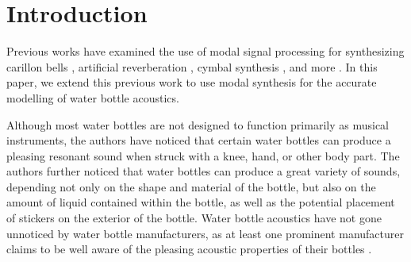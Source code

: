\documentclass[twoside,a4paper]{article}
\title{\papertitle}
\affiliation{
\paperauthorA \, }
{\href{http://ccrma.stanford.edu}{Center for Computer Research in Music and Acoustics} \\ Stanford University \\ Palo Alto, CA \\ {\tt\{jatin|kermit|mrau\}@ccrma.stanford.edu}}
\newif\ifpdf
\begin{document}
\ifpdf %
  \DeclareGraphicsExtensions{.png,.jpg,.pdf}
\else  %
\fi

\maketitle
%
\begin{abstract}
We present a method for accurately synthesizing the acoustic response
of a water bottle using modal signal processing. We take extensive
measurements of two water bottles with considerations for how the amount of water within the bottles and stickers attached to the exterior
of the bottles affect the sound. We perform modal analysis of these measurements and implement a modal water bottle model as a real-time synthesizer.
\end{abstract}

\section{Introduction} \label{sec:intro}
%
Previous works have examined the use of modal signal processing
for synthesizing carillon bells
\cite{canfielddafilou:werner:bellEffects:2017,rau:das:canfielddafilou:carillon:2019},
artificial reverberation \cite{abel2014a}, cymbal synthesis \cite{travis_cymbals},
and more \cite{abel_kurt_modal}.
In this paper, we extend this previous work to use modal synthesis
for the accurate modelling of water bottle acoustics.

Although most water bottles are not designed to function primarily as musical
instruments, the authors have noticed that certain water bottles
can produce a pleasing resonant sound when struck with a knee, hand,
or other body part. The authors further noticed that water bottles can
produce a great variety of sounds, depending not only on the shape and
material of the bottle, but also on the amount of liquid contained
within the bottle, as well as the potential placement of stickers on the
exterior of the bottle. Water bottle acoustics have not gone unnoticed
by water bottle manufacturers, as at least one prominent manufacturer claims
to be well aware of the pleasing acoustic properties of their bottles
\cite{hydroflask_email}.
\end{document}
